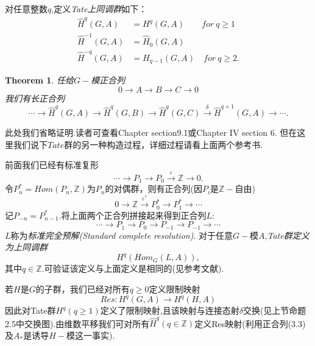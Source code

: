 \documentclass[UTF8]{article}
\newtheorem{thm}{Theorem}[section]
\begin{document}
对任意整数$q$,定义\emph{Tate上同调群}如下：
\[
\begin{split}
\widehat{H}^{q}(G,A)&=H^{q}(G,A) \qquad for \ q\geq 1\\
\widehat{H}^{-1}(G,A)&=\widehat{H}_{0}(G,A) \\
\widehat{H}^{-q}(G,A)&=H_{q-1}(G,A)\quad for \ q\geq 2.
\end{split}
\]
\begin{thm}\label{thm:Tate group}
	任给$G-$模正合列$$
	0\rightarrow A\rightarrow B\rightarrow C\rightarrow 0
	$$
	我们有长正合列
	$$
	\cdots\rightarrow \widehat{H}^{q}(G,A)\rightarrow\widehat{H}^{q}(G,B)\rightarrow\widehat{H}^{q}(G,C)\stackrel{\delta}{\longrightarrow }\widehat{H}^{q+1}(G,A)\rightarrow \cdots.
	$$
\end{thm}
此处我们省略证明.读者可查看\cite{Ro}Chapter section9.1或\cite{Ant}Chapter IV section 6.
但在这里我们说下$Tate$群的另一种构造过程，详细过程请看上面两个参考书.

前面我们已经有标准复形
$$
\cdots\rightarrow P_{1}\rightarrow P_{0}\stackrel{\varepsilon}{\rightarrow}\mathbb{Z}\rightarrow 0.
$$
令$P_{n}^{*}=Hom(P_{n},\mathbb{Z})$为$P_{n}$的对偶群，则有正合列(因$P_{i}$是$\mathbb{Z}-$自由)
$$
0\rightarrow\mathbb{Z}\stackrel{\varepsilon^{*}}{\rightarrow}P^{*}_{0}\rightarrow P^{*}_{1}\rightarrow \cdots
$$
记$P_{-n}=P_{n-1}^{*}$.将上面两个正合列拼接起来得到正合列$L:$
$$
\cdots\rightarrow P_{1}\rightarrow P_{0}\rightarrow P_{-1}\rightarrow P_{-1}\rightarrow \cdots
$$
$L$称为\emph{标准完全预解(Standard complete resolution)}.
对于任意$G-$模$A$,\emph{Tate群定义为上同调群}
$$H^{q}(Hom_{G}(L,A)),$$
其中$q\in\mathbb{Z}$.可验证该定义与上面定义是相同的(见参考文献).


若$H$是$G$的子群，我们已经对所有$q\geq 0$定义限制映射$$
Res:H^{q}(G,A)\rightarrow H^{q}(H,A)
$$
因此对Tate群$H^{q}(q\geq 1)$定义了限制映射,且该映射与连接态射$\delta$交换(见上节命题2.5中交换图).由维数平移我们可对所有$\widehat{H}^{q}(q\in\mathbb{Z})$定义Res映射(利用正合列(3.3)及$A_{*}$是诱导$H-$模这一事实).
\end{document}
